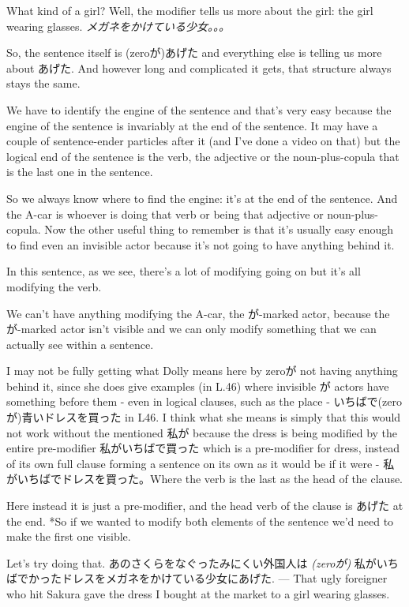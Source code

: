 What kind of a girl? Well, the modifier tells us more about the girl: the girl wearing glasses. {\em メガネをかけている少女。。。}

So, the sentence itself is (zeroが)あげた and everything else is telling us more about あげた. And however long and complicated it gets, that structure always stays the same.

We have to identify the engine of the sentence and that's very easy because the engine of the sentence is invariably at the end of the sentence. It may have a couple of sentence-ender particles after it (and I've done a video on that) but the logical end of the sentence is the verb, the adjective or the noun-plus-copula that is the last one in the sentence.

So we always know where to find the engine: it's at the end of the sentence. And the A-car is whoever is doing that verb or being that adjective or noun-plus-copula. Now the other useful thing to remember is that it's usually easy enough to find even an invisible actor because it's not going to have anything behind it.

In this sentence, as we see, there's a lot of modifying going on but it's all modifying the verb.

{}

We can't have anything modifying the A-car, the が-marked actor, because the が-marked actor isn't visible and we can only modify something that we can actually see within a sentence.

I may not be fully getting what Dolly means here by zeroが not having anything behind it, since she does give examples (in L.46) where invisible が actors have something before them - even in logical clauses, such as the place - いちばで(zeroが)青いドレスを買った in L46. I think what she means is simply that this would not work without the mentioned 私が because the dress is being modified by the entire pre-modifier 私がいちばで買った which is a pre-modifier for dress, instead of its own full clause forming a sentence on its own as it would be if it were - 私がいちばでドレスを買った。Where the verb is the last as the head of the clause.

Here instead it is just a pre-modifier, and the head verb of the clause is あげた at the end. *So if we wanted to modify both elements of the sentence we'd need to make the first one visible.

Let's try doing that. あのさくらをなぐったみにくい外国人は {\em (zeroが)} 私がいちばでかったドレスをメガネをかけている少女にあげた. --- That ugly foreigner who hit Sakura gave the dress I bought at the market to a girl wearing glasses.

